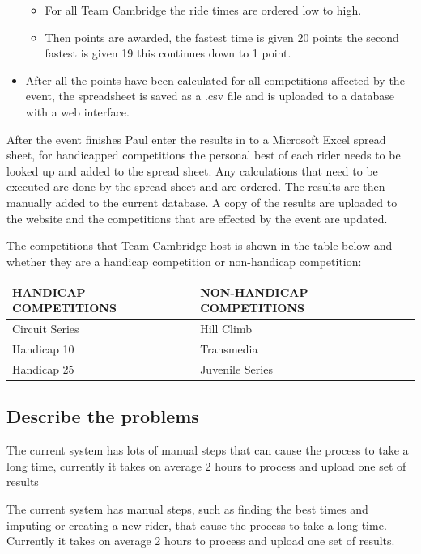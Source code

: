 \begin{itemize}
	\begin{itemize}
	\item For all Team Cambridge the ride times are ordered low to high.
	
	\item Then points are awarded, the fastest time is given 20 points the second fastest is given 19 this continues down to 1 point.
	\end{itemize}
	
	\item After all the points have been calculated for all competitions affected by the event, the spreadsheet is saved as a .csv file and is uploaded to a database with a web interface.
\end{itemize}

After the event finishes Paul enter the results in to a Microsoft Excel spread sheet, for handicapped competitions the personal best of each rider needs to be looked up and added to the spread sheet. Any calculations that need to be executed are done by the spread sheet and are ordered. The results are then manually added to the current database. A copy of the results are uploaded to the website and the competitions that are effected by the event are updated.

The competitions that Team Cambridge host is shown in the table below and whether they are a handicap competition or non-handicap competition:

\begin{tabular}{|l | l|}
	\hline
	HANDICAP COMPETITIONS & NON-HANDICAP COMPETITIONS \\ \hline
	Circuit Series        & Hill Climb \\ \hline 
	Handicap 10           & Transmedia \\ \hline
	Handicap 25           & Juvenile Series \\ \hline
\end{tabular}

\subsection{Describe the problems}

The current system has lots of manual steps that can cause the process to take a long time, currently it takes on average 2 hours to process and upload one set of results

The current system has manual steps, such as finding the best times and imputing or creating a new rider, that cause the process to take a long time. Currently it takes on average 2 hours to process and upload one set of results.

